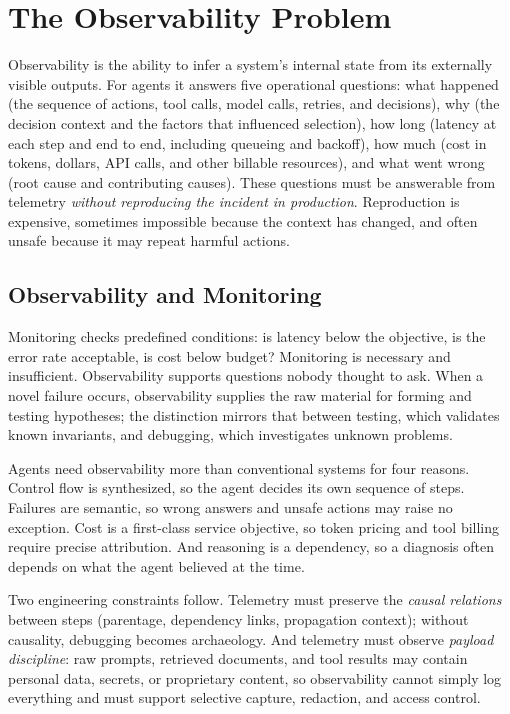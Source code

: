 \documentclass[11pt]{book}
\begin{document}
\section{The Observability Problem}

Observability is the ability to infer a system's internal state from its externally visible outputs. For agents it answers five operational questions: what happened (the sequence of actions, tool calls, model calls, retries, and decisions), why (the decision context and the factors that influenced selection), how long (latency at each step and end to end, including queueing and backoff), how much (cost in tokens, dollars, API calls, and other billable resources), and what went wrong (root cause and contributing causes). These questions must be answerable from telemetry \textit{without reproducing the incident in production}. Reproduction is expensive, sometimes impossible because the context has changed, and often unsafe because it may repeat harmful actions.

\subsection{Observability and Monitoring}

Monitoring checks predefined conditions: is latency below the objective, is the error rate acceptable, is cost below budget? Monitoring is necessary and insufficient. Observability supports questions nobody thought to ask. When a novel failure occurs, observability supplies the raw material for forming and testing hypotheses; the distinction mirrors that between testing, which validates known invariants, and debugging, which investigates unknown problems.

Agents need observability more than conventional systems for four reasons. Control flow is synthesized, so the agent decides its own sequence of steps. Failures are semantic, so wrong answers and unsafe actions may raise no exception. Cost is a first-class service objective, so token pricing and tool billing require precise attribution. And reasoning is a dependency, so a diagnosis often depends on what the agent believed at the time.

Two engineering constraints follow. Telemetry must preserve the \textit{causal relations} between steps (parentage, dependency links, propagation context); without causality, debugging becomes archaeology. And telemetry must observe \textit{payload discipline}: raw prompts, retrieved documents, and tool results may contain personal data, secrets, or proprietary content, so observability cannot simply log everything and must support selective capture, redaction, and access control.
\end{document}
